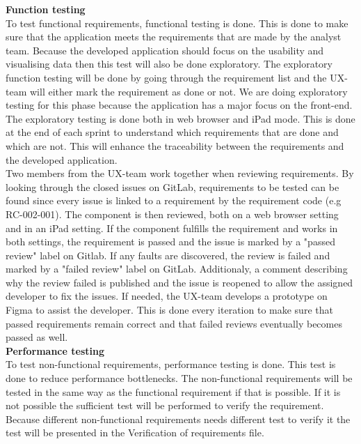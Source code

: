 \noindent\textbf{Function testing}\\
To test functional requirements, functional testing is done. This is done to make sure that the application meets the requirements that are made by the analyst team. Because the developed application should focus on the usability and visualising data then this test will also be done exploratory. The exploratory function testing will be done by going through the requirement list and the UX-team will either mark the requirement as done or not. We are doing exploratory testing for this phase because the application has a major focus on the front-end. The exploratory testing is done both in web browser and iPad mode. This is done at the end of each sprint to understand which requirements that are done and which are not. This will enhance the traceability between the requirements and the developed application. \\

\noindent Two members from the UX-team work together when reviewing requirements. By looking through the closed issues on GitLab, requirements to be tested can be found since every issue is linked to a requirement by the requirement code (e.g RC-002-001). The component is then reviewed, both on a web browser setting and in an iPad setting. If the component fulfills the requirement and works in both settings, the requirement is passed and the issue is marked by a "passed review" label on Gitlab. If any faults are discovered, the review is failed and marked by a "failed review" label on GitLab. Additionaly, a comment describing why the review failed is published and the issue is reopened to allow the assigned developer to fix the issues. If needed, the UX-team develops a prototype on Figma to assist the developer. This is done every iteration to make sure that passed requirements remain correct and that failed reviews eventually becomes passed as well. \\ 


\noindent\textbf{Performance testing}\\
To test non-functional requirements, performance testing is done. This test is done to reduce performance bottlenecks. The non-functional requirements will be tested in the same way as the functional requirement if that is possible. If it is not possible the sufficient test will be performed to verify the requirement. Because different non-functional requirements needs different test to verify it the test will be presented in the Verification of requirements file. \\

